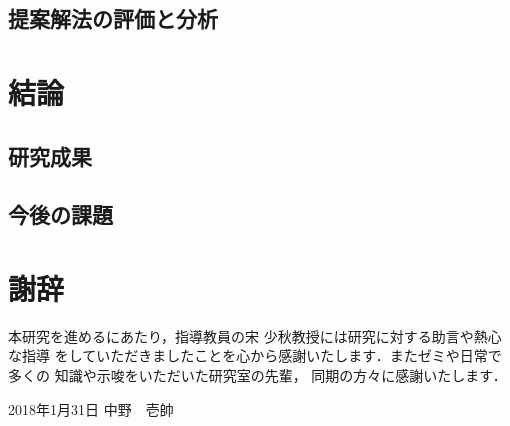 \documentclass[12pt]{optlab-bachelor}
\def\氏名{中野　壱帥}
\begin{document}
\section{提案解法の評価と分析}

\chapter{結論}

\section{研究成果}

\section{今後の課題}

\chapter*{謝辞}
本研究を進めるにあたり，指導教員の宋 少秋教授には研究に対する助言や熱心な指導
をしていただきましたことを心から感謝いたします．またゼミや日常で多くの
知識や示唆をいただいた研究室の先輩，
同期の方々に感謝いたします．

\begin{flushright}
  2018年1月31日 \氏名
\end{flushright}
\endmatter %
\end{document}
